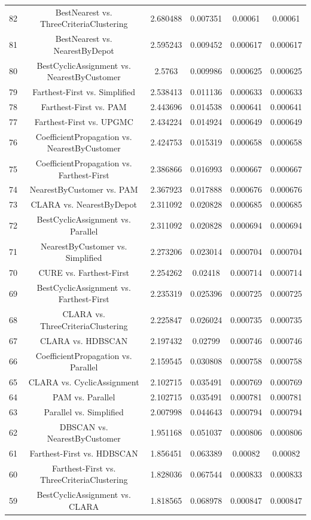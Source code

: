 \documentclass[a4paper,10pt]{article}
\begin{document}
\begin{landscape}
\begin{table}[!htp]
\begin{tabular}{cccccc}
82&BestNearest vs. ThreeCriteriaClustering&2.680488&0.007351&0.00061&0.00061\\
81&BestNearest vs. NearestByDepot&2.595243&0.009452&0.000617&0.000617\\
80&BestCyclicAssignment vs. NearestByCustomer&2.5763&0.009986&0.000625&0.000625\\
79&Farthest-First vs. Simplified&2.538413&0.011136&0.000633&0.000633\\
78&Farthest-First vs. PAM&2.443696&0.014538&0.000641&0.000641\\
77&Farthest-First vs. UPGMC&2.434224&0.014924&0.000649&0.000649\\
76&CoefficientPropagation vs. NearestByCustomer&2.424753&0.015319&0.000658&0.000658\\
75&CoefficientPropagation vs. Farthest-First&2.386866&0.016993&0.000667&0.000667\\
74&NearestByCustomer vs. PAM&2.367923&0.017888&0.000676&0.000676\\
73&CLARA vs. NearestByDepot&2.311092&0.020828&0.000685&0.000685\\
72&BestCyclicAssignment vs. Parallel&2.311092&0.020828&0.000694&0.000694\\
71&NearestByCustomer vs. Simplified&2.273206&0.023014&0.000704&0.000704\\
70&CURE vs. Farthest-First&2.254262&0.02418&0.000714&0.000714\\
69&BestCyclicAssignment vs. Farthest-First&2.235319&0.025396&0.000725&0.000725\\
68&CLARA vs. ThreeCriteriaClustering&2.225847&0.026024&0.000735&0.000735\\
67&CLARA vs. HDBSCAN&2.197432&0.02799&0.000746&0.000746\\
66&CoefficientPropagation vs. Parallel&2.159545&0.030808&0.000758&0.000758\\
65&CLARA vs. CyclicAssignment&2.102715&0.035491&0.000769&0.000769\\
64&PAM vs. Parallel&2.102715&0.035491&0.000781&0.000781\\
63&Parallel vs. Simplified&2.007998&0.044643&0.000794&0.000794\\
62&DBSCAN vs. NearestByCustomer&1.951168&0.051037&0.000806&0.000806\\
61&Farthest-First vs. HDBSCAN&1.856451&0.063389&0.00082&0.00082\\
60&Farthest-First vs. ThreeCriteriaClustering&1.828036&0.067544&0.000833&0.000833\\
59&BestCyclicAssignment vs. CLARA&1.818565&0.068978&0.000847&0.000847\\

\end{tabular}
\end{table}
\end{landscape}
\end{document}
